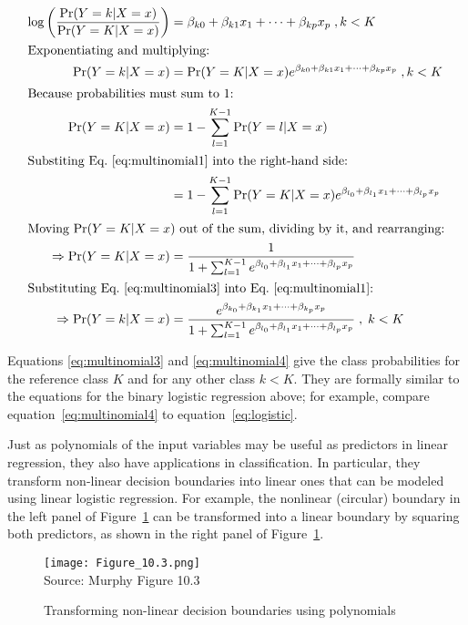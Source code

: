 \begin{align}
\log \left( \frac{\Pr(Y=k | X=x)}{\Pr(Y=K | X=x)}\right) &= \beta_{k0}+\beta_{k1}x_1 + \cdots + \beta_{kp}x_p \; , k<K \nonumber \\
\intertext{Exponentiating and multiplying:}
\Pr(Y=k | X=x) &= \Pr(Y=K | X=x) e^{\beta_{k0}+\beta_{k1}x_1 + \cdots + \beta_{kp}x_p} \;, k<K \label{eq:multinomial1} \\
\intertext{Because probabilities must sum to 1:}
\Pr(Y=K | X=x) &= 1 - \sum_{l=1}^{K-1} \Pr(Y=l | X=x) \nonumber \\
\intertext{Substiting Eq.~\ref{eq:multinomial1} into the right-hand side:}
&= 1 - \sum_{l=1}^{K-1} \Pr(Y=K | X=x) e^{\beta_{l_0}+\beta_{l_1}x_1 + \cdots + \beta_{l_p}x_p} \nonumber \\
\intertext{Moving $\Pr(Y=K|X=x)$ out of the sum, dividing by it, and rearranging:}
\Rightarrow \Pr(Y=K | X = x) &= \frac{1}{1 + \sum_{l=1}^{K-1} e^{\beta_{l_0}+\beta_{l_1}x_1 + \cdots + \beta_{l_p}x_p}} \label{eq:multinomial3} \\
\intertext{Substituting Eq.~\ref{eq:multinomial3} into Eq.~\ref{eq:multinomial1}:}
\Rightarrow \Pr(Y=k|X=x) &= \frac{e^{\beta_{k_0}+\beta_{k_1}x_1 + \cdots + \beta_{k_p}x_p}}{1 + \sum_{l=1}^{K-1} e^{\beta_{l_0}+\beta_{l_1}x_1 + \cdots + \beta_{l_p}x_p}} \;, \; k < K \label{eq:multinomial4} 
\end{align}

Equations \ref{eq:multinomial3} and \ref{eq:multinomial4} give the class probabilities for the reference class $K$ and for any other class $k < K$. They are formally similar to the equations for the binary logistic regression above; for example, compare equation~\ref{eq:multinomial4} to equation~\ref{eq:logistic}.

Just as polynomials of the input variables may be useful as predictors in linear regression, they also have applications in classification. In particular, they transform non-linear decision boundaries into linear ones that can be modeled using linear logistic regression. For example, the nonlinear (circular) boundary in the left panel of Figure~\ref{fig:nonlinearboundary} can be transformed into a linear boundary by squaring both predictors, as shown in the right panel of Figure~\ref{fig:nonlinearboundary}.

\begin{figure}
\centering
\texttt{[image: Figure\_10.3.png]} \\
\scriptsize Source: Murphy Figure 10.3
\caption{Transforming non-linear decision boundaries using polynomials}
\label{fig:nonlinearboundary}
\end{figure}


